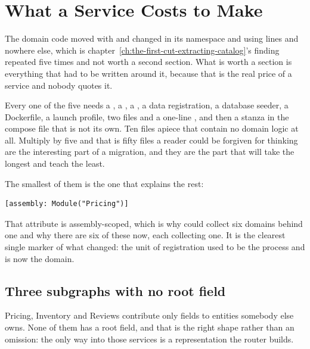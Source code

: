 \section{What a Service Costs to Make}
\label{sec:ch12-what-a-service-costs-to-make}
%

The domain code moved with  and changed in its namespace and using
lines and nowhere else, which is
chapter~\ref{ch:the-first-cut-extracting-catalog}'s finding repeated five times
and not worth a second section. What is worth a section is everything that had to be
written around it, because that is the real price of a service and nobody quotes
it.

Every one of the five needs a , a , a
, a data registration, a database seeder, a Dockerfile, a launch
profile, two  files and a one-line , and
then a stanza in the compose file that is not its own. Ten files apiece that
contain no domain logic at all. Multiply by five and that is fifty files a
reader could be forgiven for thinking are the interesting part of a migration,
and they are the part that will take the longest and teach the least.

%
The smallest of them is the one that explains the rest:

\begin{verbatim}
[assembly: Module("Pricing")]
\end{verbatim}

That attribute is assembly-scoped, which is why  could collect
six domains behind one  and why there are six of these now,
each collecting one. It is the clearest single marker of what changed: the unit
of registration used to be the process and is now the domain.

\subsection*{Three subgraphs with no root field}

%
Pricing, Inventory and Reviews contribute only fields to entities somebody else
owns. None of them has a root field, and that is the right shape rather than an
omission: the only way into those services is a representation the router
builds.

